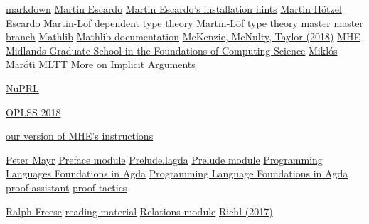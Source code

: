 \href{https://daringfireball.net/projects/markdown/}{markdown}
\href{https://www.cs.bham.ac.uk/~mhe}{Martin Escardo}
\href{https://github.com/martinescardo/HoTT-UF-Agda-Lecture-Notes/blob/master/INSTALL.md}{Martin Escardo's installation hints}
\href{https://www.cs.bham.ac.uk/~mhe}{Martin Hötzel Escardo}
\href{https://ncatlab.org/nlab/show/Martin-L%C3%B6f+dependent+type+theory}{Martin-Löf dependent type theory}
\href{https://ncatlab.org/nlab/show/Martin-L%C3%B6f+dependent+type+theory}{Martin-Löf type theory}
\href{https://gitlab.com/ualib/ualib.gitlab.io/tree/master}{master}
\href{https://gitlab.com/ualib/ualib.gitlab.io/tree/master}{master branch}
\href{https://github.com/leanprover-community/mathlib/}{Mathlib}
\href{https://leanprover-community.github.io/papers/mathlib-paper.pdf}{Mathlib documentation}
\href{https://www.amazon.com/gp/product/1470442957/ref=as_li_qf_asin_il_tl?ie=UTF8&tag=typefunc-20&creative=9325&linkCode=as2&creativeASIN=1470442957&linkId=b3109d9c28ceb872df7d4b84b1cc4f29}{McKenzie, McNulty, Taylor (2018)}
\href{https://www.cs.bham.ac.uk/~mhe}{MHE}
\href{http://events.cs.bham.ac.uk/mgs2019/}{Midlands Graduate School in the Foundations of Computing Science}
\href{http://www.math.u-szeged.hu/~mmaroti/}{Miklós Maróti}
\href{https://ncatlab.org/nlab/show/Martin-L%C3%B6f+dependent+type+theory}{MLTT}
\href{https://leanprover.github.io/theorem_proving_in_lean/interacting_with_lean.html?highlight=implicit#more-on-implicit-arguments}{More on Implicit Arguments}

\href{http://www.nuprl.org/}{NuPRL}

\href{https://www.cs.uoregon.edu/research/summerschool/summer18/topics.php#Bauer}{OPLSS 2018}

\href{emacs/INSTALL_AGDA.md}{our version of MHE's instructions}

\href{http://math.colorado.edu/~mayr/}{Peter Mayr}
\href{https://gitlab.com/ualib/ualib.gitlab.io/-/blob/master/UALib/Preface.lagda}{Preface module}
\href{https://gitlab.com/ualib/ualib.gitlab.io/-/blob/master/UALib/Prelude.lagda}{Prelude.lagda}
\href{https://gitlab.com/ualib/ualib.gitlab.io/-/blob/master/UALib/Prelude.lagda}{Prelude module}
\href{https://plfa.github.io/}{Programming Languages Foundations in Agda}
\href{https://plfa.github.io/}{Programming Language Foundations in Agda}
\href{https://en.wikipedia.org/wiki/Proof_assistant}{proof assistant}
\href{https://en.wikipedia.org/wiki/Tactic_(proof_assistant)}{proof tactics}

\href{https://math.hawaii.edu/~ralph/}{Ralph Freese}
\href{https://arxiv.org/abs/1807.05923}{reading material}
\href{https://gitlab.com/ualib/ualib.gitlab.io/-/blob/master/UALib/Relations.lagda}{Relations module}
\href{http://www.math.jhu.edu/~eriehl/context/}{Riehl (2017)}

